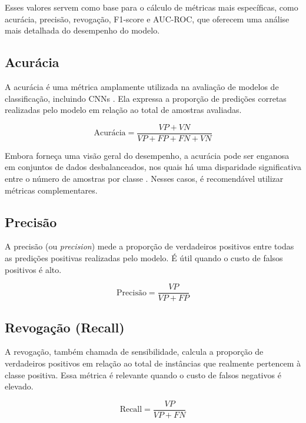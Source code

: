 Esses valores servem como base para o cálculo de métricas mais específicas, como acurácia, precisão, revogação, F1-score e AUC-ROC, que oferecem uma análise mais detalhada do desempenho do modelo.

\subsection{Acurácia}

A acurácia é uma métrica amplamente utilizada na avaliação de modelos de classificação, incluindo CNNs \cite{haykin2001redes}. Ela expressa a proporção de predições corretas realizadas pelo modelo em relação ao total de amostras avaliadas.

\begin{equation}
\label{eq:acuracia}
\text{Acurácia} = \frac{VP + VN}{VP + FP + FN + VN}
\end{equation}

Embora forneça uma visão geral do desempenho, a acurácia pode ser enganosa em conjuntos de dados desbalanceados, nos quais há uma disparidade significativa entre o número de amostras por classe \cite{juraszek2014reconhecimento}. Nesses casos, é recomendável utilizar métricas complementares.

\subsection{Precisão}

A precisão (ou \textit{precision}) mede a proporção de verdadeiros positivos entre todas as predições positivas realizadas pelo modelo. É útil quando o custo de falsos positivos é alto.

\begin{equation}
\text{Precisão} = \frac{VP}{VP + FP}
\end{equation}

\subsection{Revogação (Recall)}

A revogação, também chamada de sensibilidade, calcula a proporção de verdadeiros positivos em relação ao total de instâncias que realmente pertencem à classe positiva. Essa métrica é relevante quando o custo de falsos negativos é elevado.

\begin{equation}
\text{Recall} = \frac{VP}{VP + FN}
\end{equation}

